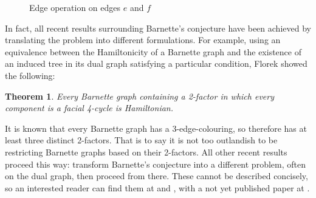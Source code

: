 \documentclass{scrartcl}
\theoremstyle{definition}
\theoremstyle{plain}
\newtheorem{theorem}{Theorem}
\begin{document}
\begin{figure}
    \centering
    \caption{Edge operation on edges $e$ and $f$}
    \label{fig:edge operation}
\end{figure}

In fact, all recent results surrounding Barnette's conjecture have been achieved by translating the
problem into different formulations.
For example, using an equivalence \cite{Stein1971-zh} between the Hamiltonicity of a Barnette graph
and the existence of an induced tree in its dual graph satisfying a particular condition, Florek
\cite{Florek2010-un} showed the following:

\begin{theorem}
    Every Barnette graph containing a 2-factor in which every component is a facial 4-cycle is
    Hamiltonian.
\end{theorem}

It is known \cite{Konig1916-fe} that every Barnette graph has a 3-edge-colouring, so therefore has
at least three distinct 2-factors.
That is to say it is not too outlandish to be restricting Barnette graphs based on their 2-factors.
All other recent results proceed this way: transform Barnette's conjecture into a different
problem, often on the dual graph, then proceed from there.
These cannot be described concisely, so an interested reader can find them at
\cite{Bagheri_Gh2021-ic} and \cite{Florek2016-ip}, with a not yet published paper at
\cite{Florek2023-vw}.
\end{document}
